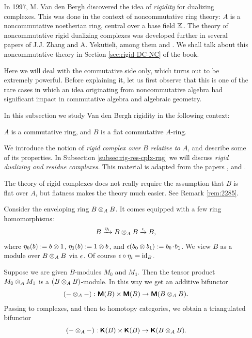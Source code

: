 In 1997, M. Van den Bergh \cite{VdB} discovered the idea of {\em rigidity} for 
dualizing complexes. This was done in the context of noncommutative ring 
theory: $A$ is a noncommutative noetherian ring, central over a base field 
$\mathbb{K}$. The theory of noncommutative rigid dualizing complexes was developed 
further in several papers of J.J. Zhang and A. Yekutieli, among them 
\cite{YeZh1} and \cite{YeZh2}. We shall talk about this noncommutative theory in 
Section \ref{sec:rigid-DC-NC} of the book. 

Here we will deal with the commutative side only, which turns out to be 
extremely powerful. Before explaining it, let us first observe that this is 
one of the rare cases in which an idea originating from noncommutative 
algebra had significant impact in commutative algebra and algebraic geometry.  

In this subsection we study Van den Bergh rigidity in the following context: 

\begin{setup} \label{set:2285}
$A$ is a commutative ring, and $B$ is a flat commutative $A$-ring. 
\end{setup}

We introduce the notion of {\em rigid complex over $B$ relative to $A$},
and describe some of its properties. In Subsection 
\ref{subsec:rig-res-cplx-rng} we will discuss {\em rigid dualizing and residue
complexes}. This material is adapted from the papers \cite{YeZh3}, \cite{YeZh4} 
and \cite{Ye11}. 

The theory of rigid complexes does not really require the assumption
that $B$ is flat over $A$, but flatness makes the theory much easier. See 
Remark \ref{rem:2285}. 

Consider the enveloping ring $B \otimes_A B$. It comes equipped with a few ring 
homomorphisms: 
\begin{equation} \label{eqn:2281}
B \xrightarrow{\eta_i} B \otimes_{A} B \xrightarrow{\epsilon} B ,
\end{equation}
where $\eta_0(b) := b \otimes 1$, $\eta_1(b) := 1 \otimes b$, and  
$\epsilon(b_0 \otimes b_1) := b_0 \mspace{1.5mu}{\cdot}\mspace{1.5mu} b_1$. We view $B$ as a module over 
$B \otimes_{A} B$ via $\epsilon$. Of course $\epsilon \circ \eta_i = \operatorname{id}_B$. 

Suppose we are given $B$-modules $M_0$ and $M_1$. Then the tensor product
$M_0 \otimes_{A} M_1$ is a $(B \otimes_{A} B)$-module. In this way we get an additive 
bifunctor
\[ (- \otimes_A -) : \boldsymbol{\mathsf{M}}(B) \times \boldsymbol{\mathsf{M}}(B) \to \boldsymbol{\mathsf{M}}(B \otimes_{A} B) . \]
Passing to complexes, and then to homotopy categories, we obtain a triangulated 
bifunctor
\begin{equation} \label{eqn:2276}
(- \otimes_A -) : \boldsymbol{\mathsf{K}}(B) \times \boldsymbol{\mathsf{K}}(B) \to \boldsymbol{\mathsf{K}}(B \otimes_{A} B) . 
\end{equation}

